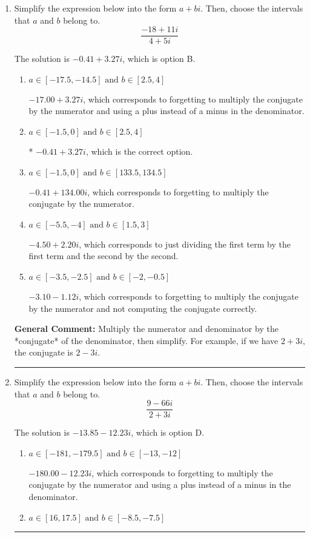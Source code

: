 \documentclass{extbook}[14pt]
\newcommand{\litem}[1]{\item #1

\rule{\textwidth}{0.4pt}}
\begin{document}
\begin{enumerate}
{ Irrational numbers are more than just square root of 3: adding or subtracting values from square root of 3 is also irrational.
}
\litem{
Simplify the expression below into the form $a+bi$. Then, choose the intervals that $a$ and $b$ belong to.
\[ \frac{-18 + 11 i}{4 + 5 i} \]

The solution is \( -0.41  + 3.27 i \), which is option B.\begin{enumerate}[label=\Alph*.]
\item \( a \in [-17.5, -14.5] \text{ and } b \in [2.5, 4] \)

 $-17.00  + 3.27 i$, which corresponds to forgetting to multiply the conjugate by the numerator and using a plus instead of a minus in the denominator.
\item \( a \in [-1.5, 0] \text{ and } b \in [2.5, 4] \)

* $-0.41  + 3.27 i$, which is the correct option.
\item \( a \in [-1.5, 0] \text{ and } b \in [133.5, 134.5] \)

 $-0.41  + 134.00 i$, which corresponds to forgetting to multiply the conjugate by the numerator.
\item \( a \in [-5.5, -4] \text{ and } b \in [1.5, 3] \)

 $-4.50  + 2.20 i$, which corresponds to just dividing the first term by the first term and the second by the second.
\item \( a \in [-3.5, -2.5] \text{ and } b \in [-2, -0.5] \)

 $-3.10  - 1.12 i$, which corresponds to forgetting to multiply the conjugate by the numerator and not computing the conjugate correctly.
\end{enumerate}

\textbf{General Comment:} Multiply the numerator and denominator by the *conjugate* of the denominator, then simplify. For example, if we have $2+3i$, the conjugate is $2-3i$.
}
\litem{
Simplify the expression below into the form $a+bi$. Then, choose the intervals that $a$ and $b$ belong to.
\[ \frac{9 - 66 i}{2 + 3 i} \]

The solution is \( -13.85  - 12.23 i \), which is option D.\begin{enumerate}[label=\Alph*.]
\item \( a \in [-181, -179.5] \text{ and } b \in [-13, -12] \)

 $-180.00  - 12.23 i$, which corresponds to forgetting to multiply the conjugate by the numerator and using a plus instead of a minus in the denominator.
\item \( a \in [16, 17.5] \text{ and } b \in [-8.5, -7.5] \)


\end{enumerate}}
\end{enumerate}
\end{document}
